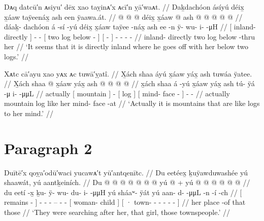\ex\label{ex:89-17-went-off-inland}%
%
\begingl
	\glpreamble	Dᴀq datcū′n ᴀsiyu′ dēx xao taỵinᴀ′x ᴀcī′n ỵā′waᴀt. //
	\glpreamble	Daḵdachóon ásíyú déix̱ x̱áaw taÿeenáx̱ ash een ÿaawa.át. //
	\gla	{}  @ {} {}
		 @ {} @ {}
		{} déix̱ x̱áaw  @ {} {}
		{} ash  @ {} {}
		 @ {} @ {} @ {} @ {} //
	\glb	{} dáaḵ- dachóon {}
		á -sí -yú
		{} déix̱ x̱áaw taÿee -náx̱ {}
		{} ash ee -n {}
		ÿ- wu- i-  -μH //
	\glc	{}[ inland- directly {}]
		 - -
		{}[ two log below - {}]
		{}[   - {}]
		- - -  - //
	\gld	{} inland- directly {}
		 {} {}
		{} two log below -thru {}
		{} her  {} {}
		 {} {} {} {} //
	\glft	‘It seems that it is directly inland where he goes off with her below two logs.’
		//
\endgl
\xe

\ex\label{ex:89-18-actually-mountains}%
%
\begingl
	\glpreamble	Xᴀtc cā′ayu xao yᴀx ᴀc tuwā′ỵatî. //
	\glpreamble	X̱ách shaa áyú x̱áaw yáx̱ ash tuwáa ÿatee. //
	\gla	X̱ách {} shaa {}  @ {}
		{} x̱áaw yáx̱ {}
		{} ash  @ {} @ {} {}
		 @ {} @ {} //
	\glb	x̱ách {} shaa {} á -yú
		{} x̱áaw yáx̱ {}
		{} ash tú- ÿá -μ {}
		i-  -μμL //
	\glc	actually {}[ mountain {}]  -
		{}[ log  {}]
		{}[  mind- face - {}]
		-  - //
	\gld	actually {} mountain {}  {}
		{} log like {}
		{} her mind- face -at {}
		 {} {} //
	\glft	‘Actually it is mountains that are like logs to her mind.’
		//
\endgl
\xe

\section{Paragraph 2}

\ex\label{ex:89-19-searching-for-girl}%
%
\begingl
	\glpreamble	Duītē′x qoỵa′odū′waci yucawᴀ′t yū′antqenītc. //
	\glpreamble	Du eetéex̱ ḵuÿawduwashée yú shaawát, yú aantḵeiních. //
	\gla	{} Du  @ {} {}
		 @ {} @ {} @ {} @ {} @ {} @ {}
		{} yú  @ {} {} +
		{} yú  @ {} @ {} @ {} @ {} @ {} @ {} {} //
	\glb	{} du eetí -x̱ {}
		ḵu- ÿ- wu- du- i-  -μμH
		{} yú sháaʷ- ÿát {}
		{} yú aan- d-  -μμL -n -í -ch {} //
	\glc	{}[  remains - {}]
		- - - -- -  -
		{}[  woman- child {}]
		{}[ · town- -  - - - - {}] //
	\gld	{} her place -of {}
		 {} {} {} {} {} {}
		{} that  {} {}
		{} those  {} {} {} {} {} {} {} //
	\glft	‘They were searching after her, that girl, those townspeople.’
		//
\endgl
\xe

